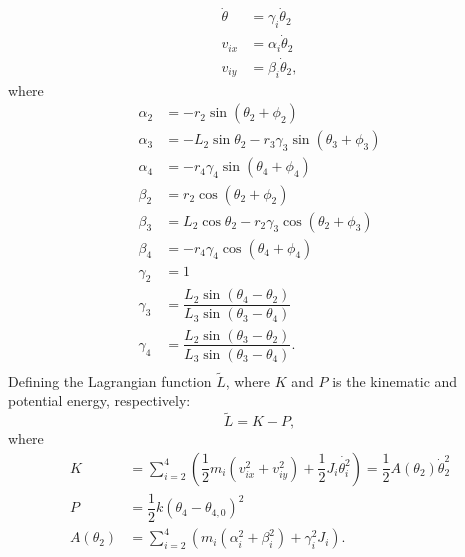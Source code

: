 \documentclass[12pt,letterpape]{article}
\begin{document}
\begin{align}
	\dot{ \theta } &= \gamma_i \dot{\theta}_2\\
	v_{ix} &= \alpha_i \dot{\theta}_2\\
	v_{iy} &= \beta_i \dot{\theta}_2,
\end{align}
% 
where
\begin{align}
	\alpha_2 &= -r_2\sin( \theta_2 + \phi_2 )\\
	\alpha_3 &= -L_2\sin\theta_2  -r_3 \gamma_3 \sin(\theta_3 + \phi_3)  \\
	\alpha_4 &= -r_4 \gamma_4 \sin( \theta_4 + \phi_4 ) \\
	\beta_2 &= r_2 \cos(\theta_2 + \phi_2) \\
	\beta_3 &= L_2 \cos\theta_2 - r_2 \gamma_3 \cos( \theta_2 + \phi_3 ) \\
	\beta_4 &= -r_4 \gamma_4 \cos(\theta_4 + \phi_4) \\
	\gamma_2 &= 1 \\
	\gamma_3 &= \dfrac{L_2 \sin( \theta_4 - \theta_2 ) }{L_3 \sin( \theta_3 - \theta_4 ) } \\
	\gamma_4 &= \dfrac{L_2 \sin( \theta_3 - \theta_2 ) }{L_3 \sin( \theta_3 - \theta_4 ) }. \\
\end{align}
% 
Defining the Lagrangian function $\tilde{L}$, where $K$ and $P$ is the kinematic
and potential energy, respectively:
$$
	\tilde{L} = K- P,
$$
% 
where
%
\begin{align}
	K &= \sum_{i=2}^4  \left( \dfrac{1}{2} m_i ( v^2_{ix} + v^2_{iy} )
		+ \dfrac{1}{2} J_i \dot{ \theta_i^2 }  \right) = \dfrac{1}{2} A(\theta_2) \dot{\theta}_2^2  \\
	P &= \dfrac{1}{2}k (\theta_4 - \theta_{4,0})^2  \\ 
	A( \theta_2 ) &= \sum_{i=2}^4 ( m_i (\alpha_i^2 + \beta_i^2) + \gamma_i^2 J_i ).
\end{align}

\end{document}
